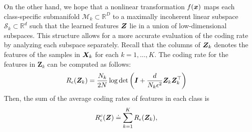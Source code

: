 \documentclass[../../book-main.tex]{subfiles}
\begin{document}
On the other hand, we hope that a nonlinear transformation $f(\bm{x})$ maps each class-specific submanifold $\mathcal{M}_k \subset \mathbb{R}^D$ to a maximally incoherent linear subspace $\mathcal{S}_k \subset \mathbb{R}^d$ such that the learned features $\bm{Z}$ lie in a union of low-dimensional subspaces. This structure allows for a more accurate evaluation of the coding rate by analyzing each subspace separately. %
Recall that the columns of $\bm{Z}_k$ denotes the features of the samples in $\bm{X}_k$ for each $k=1,\dots,K$. The coding rate for the features in $\bm Z_k$ can be computed as follows: 
\begin{align}
    R_{\epsilon}(\bm{Z}_k) = \frac{N_k}{2N}\log\det\left(\bm{I} + \frac{d}{N_k\epsilon^{2}}\bm{Z}_k\bm{Z}_k^{\top}\right)
\end{align}
Then, the sum of the average coding rates of features in each class is 
\begin{equation}
	 R_{\epsilon}^c(\bm{Z}) \doteq \sum_{k=1}^K R_{\epsilon}(\bm{Z}_k),
	\label{chap4-eqn:compress-loss-eval}
\end{equation}
\end{document}
